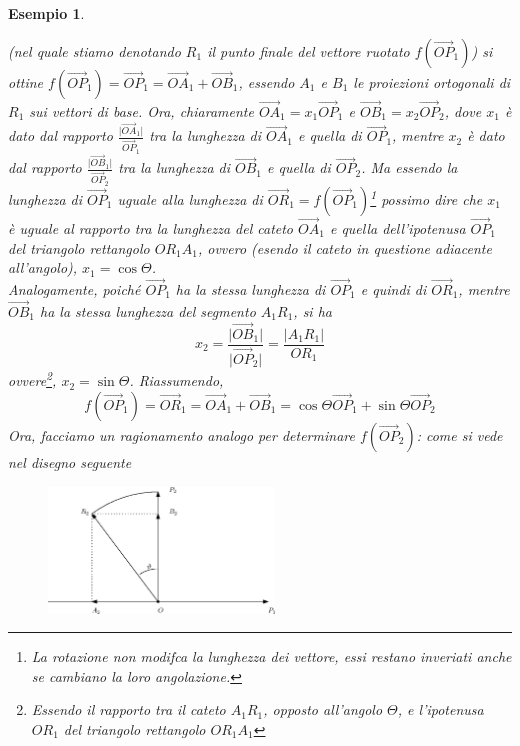 \message{ !name(algebraegeometria.tex)}\documentclass{book}
\newcommand{\abs}[1]{\lvert#1\rvert}
\newtheorem{esempio}{Esempio}
\begin{document}
\begin{esempio}
\begin{enumerate}
    (nel quale stiamo denotando $R_1$ il punto finale del vettore ruotato $f(\vec{OP}_1)$) si ottine
    $f(\vec{OP}_1)=\vec{OP}_1=\vec{OA}_1+\vec{OB}_1$, essendo $A_1$ e $B_1$ le proiezioni ortogonali di $R_1$
    sui vettori di base. Ora, chiaramente $\vec{OA}_1=x_1\vec{OP}_1$ e $\vec{OB}_1=x_2\vec{OP}_2$, dove $x_1$ è
    dato dal rapporto $\frac{\abs{\vec{OA}_1}}{\vec{OP}_1}$ tra la lunghezza di $\vec{OA}_1$ e quella di
    $\vec{OP}_1$, mentre $x_2$ è dato dal rapporto $\frac{\abs{\vec{OB}_1}}{\vec{OP}_2}$ tra la lunghezza di
    $\vec{OB}_1$ e quella di $\vec{OP}_2$. Ma essendo la lunghezza di $\vec{OP}_1$ uguale alla lunghezza di
    $\vec{OR}_1=f(\vec{OP}_1)$\footnote{La rotazione non modifca la lunghezza dei vettore, essi restano
      inveriati anche se cambiano la loro angolazione.} possimo dire che $x_1$ è uguale al rapporto tra la
    lunghezza del cateto $\vec{OA}_1$ e quella dell'ipotenusa $\vec{OP}_1$ del triangolo rettangolo $OR_1A_1$,
    ovvero (esendo il cateto in questione adiacente all'angolo), $x_1=\cos\Theta$. \\
    Analogamente, poiché $\vec{OP}_1$ ha la stessa lunghezza di $\vec{OP}_1$ e quindi di $\vec{OR}_1$, mentre
    $\vec{OB}_1$ ha la stessa lunghezza del segmento $A_1R_1$, si ha 
    \begin{equation*}
      x_2=\frac{\abs{\vec{OB}_1}}{\abs{\vec{OP}_2}}=\frac{\abs{A_1R_1}}{OR_1}
    \end{equation*}
    ovvere\footnote{Essendo il rapporto tra il cateto $A_1R_1$, opposto all'angolo $\Theta$, e l'ipotenusa
      $OR_1$ del triangolo rettangolo $OR_1A_1$}, $x_2=\sin \Theta$. Riassumendo,
    \begin{equation}
      f(\vec{OP}_1)=\vec{OR}_1=\vec{OA}_1+\vec{OB}_1=\cos\Theta \vec{OP}_1+\sin \Theta \vec{OP}_2
    \end{equation}
    Ora, facciamo un ragionamento analogo per determinare $f(\vec{OP}_2)$: come si vede nel disegno seguente
    \begin{figure}[th]
      \centering
        \includegraphics[width=6cm]{img/finiti/imgex4-3-3.eps}
    \end{figure}
      

\end{enumerate}
\end{esempio}
\end{document}
